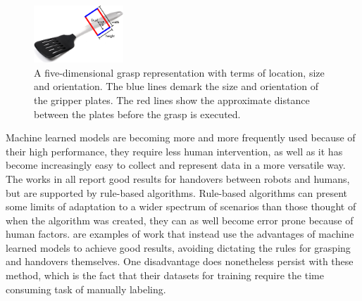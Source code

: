 \begin{figure}
	\centering
	\includegraphics[width=0.3\textwidth]{img/related-work/grasp-representation.png}
	\caption{A five-dimensional grasp representation with terms of location, size and orientation. The blue lines demark the size and orientation of the gripper plates. The red lines show the approximate distance between the plates before the grasp is executed.}
	\label{fig:grasp-representation}
\end{figure}

Machine learned models are becoming more and more frequently used because of their high performance, they require less human intervention, as well as it has become increasingly easy to collect and represent data in a more versatile way. The works in \parencite{Aleotti2012} \parencite{Suay2015} \parencite{Kim2004} all report good results for handovers between robots and humans, but are supported by rule-based algorithms. Rule-based algorithms can present some limits of adaptation to a wider spectrum of scenarios than those thought of when the algorithm was created, they can as well become error prone because of human factors. \parencite{Redmon2014} \parencite{Lenz2015} \parencite{Jiang2011} \parencite{Huebner2008a} are examples of work that instead use the advantages of machine learned models to achieve good results, avoiding dictating the rules for grasping and handovers themselves. One disadvantage does nonetheless persist with these method, which is the fact that their datasets for training require the time consuming task of manually labeling.

